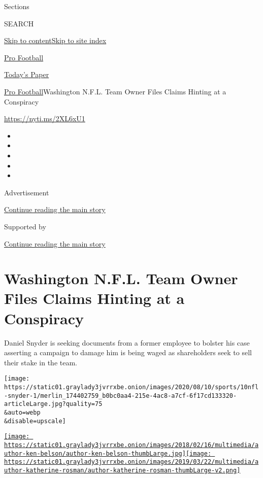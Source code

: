 Sections

SEARCH

\protect\hyperlink{site-content}{Skip to
content}\protect\hyperlink{site-index}{Skip to site index}

\href{https://www.nytimes3xbfgragh.onion/section/sports/football}{Pro
Football}

\href{https://myaccount.nytimes3xbfgragh.onion/auth/login?response_type=cookie\&client_id=vi}{}

\href{https://www.nytimes3xbfgragh.onion/section/todayspaper}{Today's
Paper}

\href{/section/sports/football}{Pro Football}\textbar{}Washington N.F.L.
Team Owner Files Claims Hinting at a Conspiracy

\url{https://nyti.ms/2XL6xU1}

\begin{itemize}
\item
\item
\item
\item
\item
\end{itemize}

Advertisement

\protect\hyperlink{after-top}{Continue reading the main story}

Supported by

\protect\hyperlink{after-sponsor}{Continue reading the main story}

\hypertarget{washington-nfl-team-owner-files-claims-hinting-at-a-conspiracy}{%
\section{Washington N.F.L. Team Owner Files Claims Hinting at a
Conspiracy}\label{washington-nfl-team-owner-files-claims-hinting-at-a-conspiracy}}

Daniel Snyder is seeking documents from a former employee to bolster his
case asserting a campaign to damage him is being waged as shareholders
seek to sell their stake in the team.

\texttt{[image: https://static01.graylady3jvrrxbe.onion/images/2020/08/10/sports/10nfl-snyder-1/merlin\_174402759\_b0bc0aa4-215e-4ac8-a7cf-6f17cd133320-articleLarge.jpg?quality=75\\\&auto=webp\\\&disable=upscale]}

\href{https://www.nytimes3xbfgragh.onion/by/ken-belson}{\texttt{[image: https://static01.graylady3jvrrxbe.onion/images/2018/02/16/multimedia/author-ken-belson/author-ken-belson-thumbLarge.jpg]}}\href{https://www.nytimes3xbfgragh.onion/by/katherine-rosman}{\texttt{[image: https://static01.graylady3jvrrxbe.onion/images/2019/03/22/multimedia/author-katherine-rosman/author-katherine-rosman-thumbLarge-v2.png]}}

